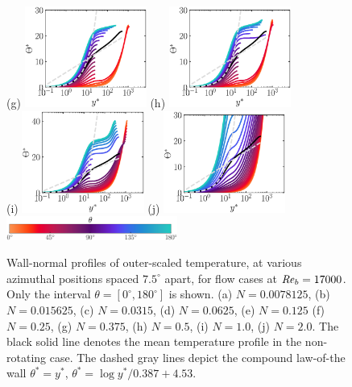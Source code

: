 \documentclass[lineno]{jfm}
\begin{document}
\begin{figure}
                (g) \includegraphics[width=4cm]{Figures/prof_ttstar_rotz0_roty0.1875.eps}
                (h) \includegraphics[width=4cm]{Figures/prof_ttstar_rotz0_roty0.25.eps} \\
                (i) \includegraphics[width=4cm]{Figures/prof_ttstar_rotz0_roty0.5.eps}
                (j) \includegraphics[width=4cm]{Figures/prof_ttstar_rotz0_roty1.0.eps} \\
                \includegraphics[width=0.5\textwidth]{Figures/theta_cmap.eps}
        \caption{
                Wall-normal profiles of
                outer-scaled temperature,
                at various azimuthal positions spaced
                $7.5^\circ$ apart,
                for flow cases at $\mbox{\textit{Re}}_b=17000$.
                Only the interval $\theta = [0^{\circ},180^{\circ}]$ is shown.
                (a) $N = 0.0078125$,
                (b) $N = 0.015625$,
                (c) $N = 0.0315$,
                (d) $N = 0.0625$,
                (e) $N = 0.125$
                (f) $N = 0.25$,
                (g) $N = 0.375$,
                (h) $N = 0.5$,
                (i) $N = 1.0$,
                (j) $N = 2.0$.
                The black solid line denotes the mean temperature profile in the
                non-rotating case.
                The dashed gray lines depict the compound law-of-the wall
		$\theta^{*}=y^*$, $\theta^{*}=\log y^*/0.387 + 4.53$.
        }
                \label{fig:tstar}
        \end{figure}
\end{document}
